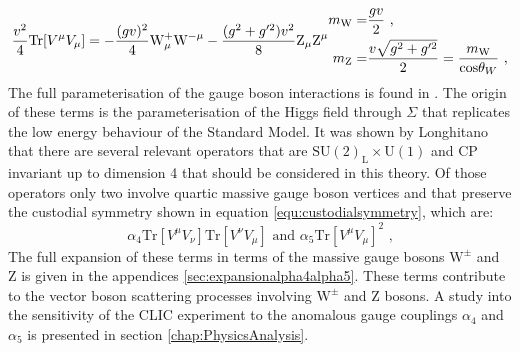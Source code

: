 %
\begin{equation}
\frac{v^{2}}{4}\text{Tr}[V^{\mu}V_{\mu}] = - \frac{(gv)^{2}}{4} \text{W}^{+}_{\mu} \text{W}^{-\mu} - \frac{(g^{2} + g'^{2})v^{2}}{8} \text{Z}_{\mu} \text{Z}^{\mu} \\
\begin{aligned}
m_{\text{W}} = & \frac{gv}{2} \text{ ,} \\
m_{\text{Z}} = & \frac{v\sqrt{g^{2} + g'^{2}}}{2} = \frac{m_{\text{W}}}{\text{cos}{\theta_{W}}} \text{ ,}
\end{aligned}
\end{equation}
%
\noindent The full parameterisation of the gauge boson interactions is found in \cite{Herrero:1994tj}.  The origin of these terms is the parameterisation of the Higgs field through $\Sigma$ that replicates the low energy behaviour of the Standard Model.  It was shown by Longhitano \cite{Longhitano:1980tm} that there are several relevant operators that are $\text{SU}(2)_{\text{L}} \times \text{U}(1)$ and CP invariant up to dimension 4 that should be considered in this theory.  Of those operators only two involve quartic massive gauge boson vertices and that preserve the custodial symmetry \cite{Belyaev:354051} shown in equation \ref{equ:custodialsymmetry}, which are:
%
\begin{equation}
\alpha_{4}\text{Tr}[V^{\mu}V_{\nu}]\text{Tr}[V^{\nu}V_{\mu}] \text{ and } \alpha_{5}\text{Tr}[V^{\mu}V_{\mu}]^{2} \text{ ,}
\end{equation}
%
\noindent The full expansion of these terms in terms of the massive gauge bosons $\text{W}^{\pm}$ and Z is given in the appendices \ref{sec:expansionalpha4alpha5}.  These terms contribute to the vector boson scattering processes involving $\text{W}^{\pm}$ and Z bosons.  A study into the sensitivity of the CLIC experiment to the anomalous gauge couplings $\alpha_{4}$ and $\alpha_{5}$ is presented in section \ref{chap:PhysicsAnalysis}.

